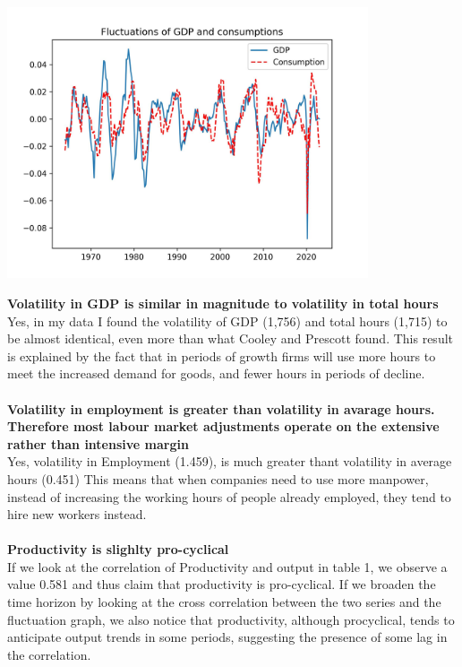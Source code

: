 \documentclass[12pt]{article}
\begin{document}
\begin{center}
\includegraphics[width=0.8\textwidth]{cnd_gdp.jpg}
\end{center}
\textbf{Volatility in GDP is similar in magnitude to volatility in total hours}\\
Yes, in my data I found the volatility of GDP (1,756) and total hours (1,715) to be almost identical, even more than what Cooley and Prescott found. This result is explained by the fact that in periods of growth firms will use more hours to meet the increased demand for goods, and fewer hours in periods of decline.\\\\
\textbf{Volatility in employment is greater than volatility in avarage hours. Therefore most labour market adjustments operate on the extensive rather than intensive margin}\\
Yes, volatility in Employment (1.459), is much greater thant volatility in average hours (0.451)
This means that when companies need to use more manpower, instead of increasing the working hours of people already employed, they tend to hire new workers instead.\\\\
\textbf{Productivity is slighlty pro-cyclical}\\
If we look at the correlation of Productivity and output in table 1, we observe a value 0.581 and thus claim that productivity is pro-cyclical. If we broaden the time horizon by looking at the cross correlation between the two series and the fluctuation graph, we also notice that productivity, although procyclical, tends to anticipate output trends in some periods, suggesting the presence of some lag in the correlation. \\
\end{document}
